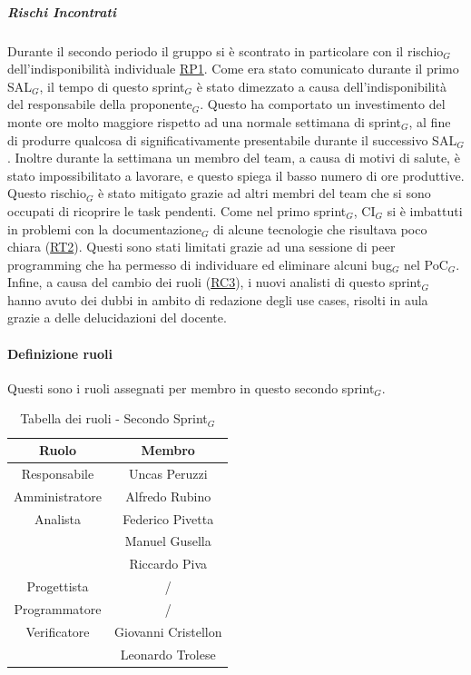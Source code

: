 \documentclass[10pt]{article}
\begin{document}
{{{    \subparagraph*{Rischi Incontrati}\mbox{}
    
    Durante il secondo periodo il gruppo si è scontrato in particolare con il rischio$_G$ dell'indisponibilità individuale \hyperref[RP1]{RP1}. Come era stato comunicato durante il primo SAL$_G$, il tempo di questo sprint$_G$ è stato dimezzato a causa dell'indisponibilità del responsabile della proponente$_G$. Questo ha comportato un investimento del monte ore molto maggiore rispetto ad una normale settimana di sprint$_G$, al fine di produrre qualcosa di significativamente presentabile durante il successivo SAL$_G$. Inoltre durante la settimana un membro del team, a causa di motivi di salute, è stato impossibilitato a lavorare, e questo spiega il basso numero di ore produttive. Questo rischio$_G$ è stato mitigato grazie ad altri membri del team che si sono occupati di ricoprire le task pendenti. Come nel primo sprint$_G$, CI$_G$ si è imbattuti in problemi con la documentazione$_G$ di alcune tecnologie che risultava poco chiara (\hyperref[RT2]{RT2}). Questi sono stati limitati grazie ad una sessione di peer programming che ha permesso di individuare ed eliminare alcuni bug$_G$ nel PoC$_G$. Infine, a causa del cambio dei ruoli (\hyperref[RC3]{RC3}), i nuovi analisti di questo sprint$_G$ hanno avuto dei dubbi in ambito di redazione degli use cases, risolti in aula grazie a delle delucidazioni del docente. 

    
    \paragraph{Definizione ruoli}\mbox{}\vspace{0.4em}
    
    Questi sono i ruoli assegnati per membro in questo secondo sprint$_G$.\\
    \begin{table}[H]
        \centering
        \begin{tabular}{|c|c|}
        \hline
        \rowcolor{gray!25}
        \textbf{Ruolo} & \textbf{Membro}\\
        \hline
        Responsabile & Uncas Peruzzi\\
        \hline
        Amministratore & Alfredo Rubino\\ 
        \hline
        Analista & Federico Pivetta\\
        & Manuel Gusella \\
        & Riccardo Piva\\
        \hline
        Progettista & / \\
        \hline
        Programmatore & / \\
        \hline
        Verificatore & Giovanni Cristellon\\
        & Leonardo Trolese\\
        \hline
        \end{tabular}
        \caption{Tabella dei ruoli - Secondo Sprint$_G$}
    \end{table}

}}}
\end{document}
